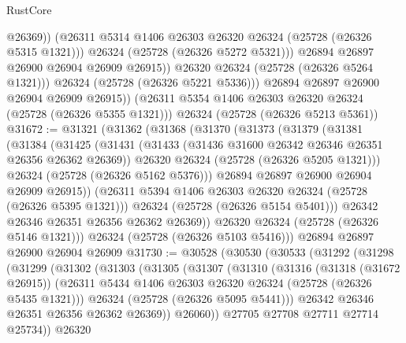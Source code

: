 \begin{lexlean}{RustCore}
\begin{coremodule}
                      @26369))
                  (@26311 @5314 @1406 @26303 @26320 @26324 (@25728 (@26326 @5315 @1321)))
                  @26324
                  (@25728 (@26326 @5272 @5321)))
                @26894
                @26897
                @26900
                @26904
                @26909
                @26915))
            @26320
            @26324
            (@25728 (@26326 @5264 @1321)))
          @26324
          (@25728 (@26326 @5221 @5336)))
        @26894
        @26897
        @26900
        @26904
        @26909
        @26915))
    (@26311 @5354 @1406 @26303 @26320 @26324 (@25728 (@26326 @5355 @1321)))
    @26324
    (@25728 (@26326 @5213 @5361))
@31672 := @31321
    (@31362
      (@31368
        (@31370
          (@31373
            (@31379
              (@31381
                (@31384
                  (@31425
                    (@31431
                      (@31433 (@31436 @31600 @26342 @26346 @26351 @26356 @26362 @26369))
                      @26320
                      @26324
                      (@25728 (@26326 @5205 @1321)))
                    @26324
                    (@25728 (@26326 @5162 @5376)))
                  @26894
                  @26897
                  @26900
                  @26904
                  @26909
                  @26915))
              (@26311 @5394 @1406 @26303 @26320 @26324 (@25728 (@26326 @5395 @1321)))
              @26324
              (@25728 (@26326 @5154 @5401)))
            @26342
            @26346
            @26351
            @26356
            @26362
            @26369))
        @26320
        @26324
        (@25728 (@26326 @5146 @1321)))
      @26324
      (@25728 (@26326 @5103 @5416)))
    @26894
    @26897
    @26900
    @26904
    @26909
@31730 := @30528
    (@30530
      (@30533
        (@31292
          (@31298
            (@31299
              (@31302
                (@31303
                  (@31305
                    (@31307
                      (@31310
                        (@31316
                          (@31318 (@31672 @26915))
                          (@26311 @5434 @1406 @26303 @26320 @26324 (@25728 (@26326 @5435 @1321)))
                          @26324
                          (@25728 (@26326 @5095 @5441)))
                        @26342
                        @26346
                        @26351
                        @26356
                        @26362
                        @26369))
                    @26060))
                @27705
                @27708
                @27711
                @27714
                @25734))
            @26320

\end{coremodule}
\end{lexlean}
